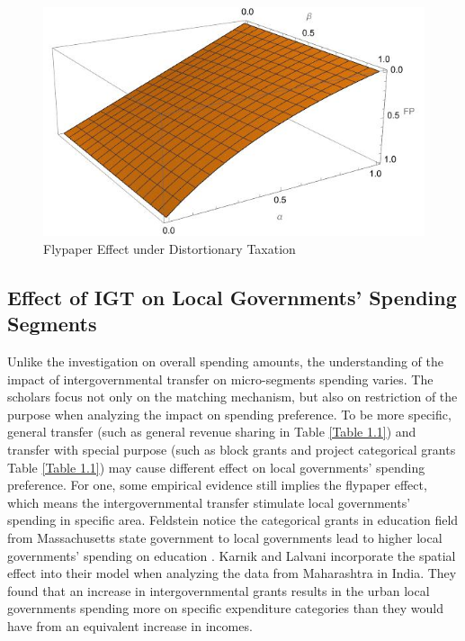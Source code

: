 \begin{figure}[H]
    \centering
    \includegraphics[scale=0.7]{Chapter-3/Figures/distorfp.jpg}
    \caption[Flypaper Effect under Distortionary Taxation]{Flypaper Effect under Distortionary Taxation
        \texttt{} }
    \label{Figure 3.5}
\end{figure}

\subsection{Effect of IGT on Local Governments' Spending Segments}
Unlike the investigation on overall spending amounts, the understanding of the impact of intergovernmental transfer on micro-segments spending varies. The scholars focus not only on the matching mechanism, but also on restriction of the purpose when analyzing the impact on spending preference. To be more specific, general transfer (such as general revenue sharing in Table \ref{Table 1.1}) and transfer with special purpose (such as block grants and project categorical grants Table \ref{Table 1.1}) may cause different effect on local governments' spending preference. For one, some empirical evidence still implies the flypaper effect, which means the intergovernmental transfer stimulate local governments' spending in specific area. Feldstein notice the categorical grants in education field from Massachusetts state government to local governments lead to higher local governments' spending on education \cite{feldstein1975wealth}. Karnik and Lalvani \cite{karnik2008flypaper} incorporate the spatial effect into their model when analyzing the data from Maharashtra in India. They found that an increase in intergovernmental grants results in the urban local governments spending more on specific expenditure categories than they would have from an equivalent increase in incomes.


